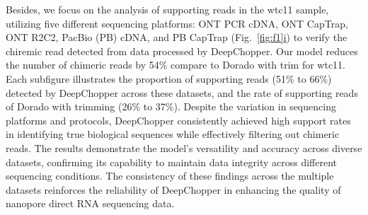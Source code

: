 \documentclass[pdflatex, sn-mathphys-num, lineno]{sn-jnl}%
\newcommand{\figref}[2]{Fig.~\hyperref[#1]{\ref*{#1}#2}}
\theoremstyle{thmstyleone}%
\theoremstyle{thmstyletwo}%
\theoremstyle{thmstylethree}%
\begin{document}
Besides, we focus on the analysis of supporting reads in the wtc11 sample, utilizing five different sequencing platforms: ONT PCR cDNA, ONT CapTrap, ONT R2C2, PacBio (PB) cDNA, and PB CapTrap (\figref{fig:f1}{i}) to verify the chiremic read detected from data processed by DeepChopper.
Our model reduces the number of chimeric reads by 54\% compare to Dorado with trim for wtc11.
Each subfigure illustrates the proportion of supporting reads (51\% to 66\%) detected by DeepChopper across these datasets, and the rate of supporting reads of Dorado with trimming (26\% to 37\%).
Despite the variation in sequencing platforms and protocols, DeepChopper consistently achieved high support rates in identifying true biological sequences while effectively filtering out chimeric reads.
The results demonstrate the model's versatility and accuracy across diverse datasets, confirming its capability to maintain data integrity across different sequencing conditions.
The consistency of these findings across the multiple datasets reinforces the reliability of DeepChopper in enhancing the quality of nanopore direct RNA sequencing data.
\end{document}
